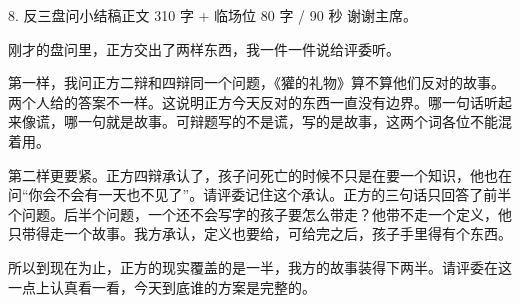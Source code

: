 \documentclass[script,con]{debate}
\begin{document}
\begin{speech}{8. 反三盘问小结稿}{正文 310 字 + 临场位 80 字 / 90 秒}
谢谢主席。


刚才的盘问里，正方交出了两样东西，我一件一件说给评委听。

第一样，我问正方二辩和四辩同一个问题，《獾的礼物》算不算他们反对的故事。两个人给的答案不一样。这说明正方今天反对的东西一直没有边界。哪一句话听起来像谎，哪一句就是故事。可辩题写的不是谎，写的是故事，这两个词各位不能混着用。

第二样更要紧。正方四辩承认了，孩子问死亡的时候不只是在要一个知识，他也在问“你会不会有一天也不见了”。请评委记住这个承认。正方的三句话只回答了前半个问题。后半个问题，一个还不会写字的孩子要怎么带走？他带不走一个定义，他只带得走一个故事。我方承认，定义也要给，可给完之后，孩子手里得有个东西。

所以到现在为止，正方的现实覆盖的是一半，我方的故事装得下两半。请评委在这一点上认真看一看，今天到底谁的方案是完整的。

\end{speech}
\end{document}
